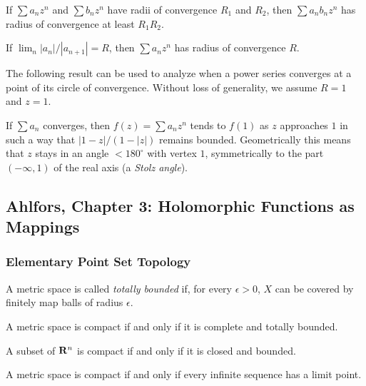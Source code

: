 \begin{proposition}
  If $\sum a_n z^n$ and $\sum b_n z^n$ have radii of convergence $R_1$ and $R_2$, then $\sum a_n b_n z^n$ has radius of convergence at least $R_1 R_2$.
\end{proposition}

\begin{proposition}
  If $\lim_n |a_n|/|a_{n+1}| = R$, then $\sum a_n z^n$ has radius of convergence $R$.
\end{proposition}

The following result can be used to analyze when a power series converges at a point of its circle of convergence. Without loss of generality, we assume $R = 1$ and $z = 1$.

\begin{theorem}
  If $\sum a_n$ converges, then $f(z) = \sum a_n z^n$ tends to $f(1)$ as $z$ approaches $1$ in such a way that $|1-z|/(1-|z|)$ remains bounded. Geometrically this means that $z$ stays in an angle $<180^\circ$ with vertex $1$, symmetrically to the part $(-\infty,1)$ of the real axis (a \emph{Stolz angle}).
\end{theorem}

\subsection{Ahlfors, Chapter 3: Holomorphic Functions as Mappings}

\subsubsection{Elementary Point Set Topology}

\begin{definition}
  A metric space is called \emph{totally bounded} if, for every $\epsilon > 0$, $X$ can be covered by finitely map balls of radius $\epsilon$.
\end{definition}

\begin{theorem}
  A metric space is compact if and only if it is complete and totally bounded.
\end{theorem}

\begin{corollary}
  A subset of $\mathbf{R}^n$ is compact if and only if it is closed and bounded.
\end{corollary}

\begin{theorem}
  A metric space is compact if and only if every infinite sequence has a limit point.
\end{theorem}

